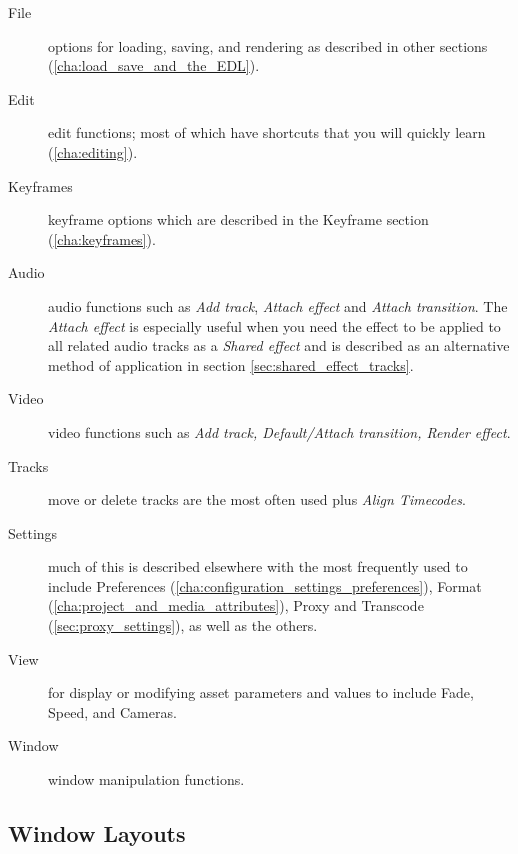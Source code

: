 \begin{description}
    \item[File]  options for loading, saving, and rendering as described in other sections (\ref{cha:load_save_and_the_EDL}).
    \item[Edit]  edit functions; most of which have shortcuts that you will quickly learn (\ref{cha:editing}).
    \item[Keyframes] keyframe options which are described in the Keyframe section (\ref{cha:keyframes}).
    \item[Audio]  audio functions such as \textit{Add track}, \textit{Attach effect}
and \textit{Attach transition}.  The \textit{Attach effect} is especially useful when
you need the effect to be applied to all related audio tracks as a \textit{Shared effect}
and is described as an alternative method of application in section \ref{sec:shared_effect_tracks}.
    \item[Video]  video functions such as \textit{Add track, Default/Attach transition, Render effect}.
    \item[Tracks]  move or delete tracks are the most often used plus \textit{Align Timecodes}.
    \item[Settings]  much of this is described elsewhere with the most frequently used to include
Preferences (\ref{cha:configuration_settings_preferences}), Format (\ref{cha:project_and_media_attributes}), 
Proxy and Transcode (\ref{sec:proxy_settings}), as well as the others.
    \item[View]  for display or modifying asset parameters and values to include Fade, Speed, and Cameras.
    \item[Window]  window manipulation functions.
\end{description}


\subsection{Window Layouts}%
\label{sub:window_layouts}

